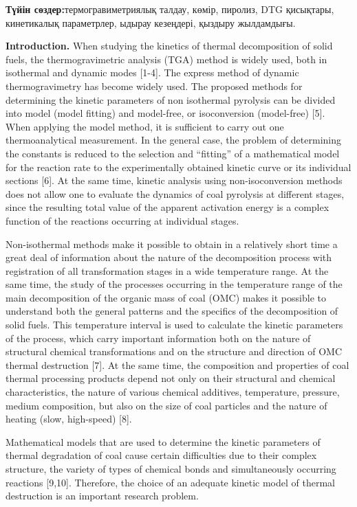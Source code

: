 {\bfseries Түйін сөздер:}термогравиметриялық талдау, көмір, пиролиз, DTG
қисықтары, кинетикалық параметрлер, ыдырау кезеңдері, қыздыру
жылдамдығы.

\begin{multicols}{2}
{\bfseries Introduction.} When studying the kinetics of thermal
decomposition of solid fuels, the thermogravimetric analysis (TGA)
method is widely used, both in isothermal and dynamic modes {[}1-4{]}.
The express method of dynamic thermogravimetry has become widely used.
The proposed methods for determining the kinetic parameters of non
isothermal pyrolysis can be divided into model (model fitting) and
model-free, or isoconversion (model-free) {[}5{]}. When applying the
model method, it is sufficient to carry out one thermoanalytical
measurement. In the general case, the problem of determining the
constants is reduced to the selection and ``fitting'' of a mathematical
model for the reaction rate to the experimentally obtained kinetic curve
or its individual sections {[}6{]}. At the same time, kinetic analysis
using non-isoconversion methods does not allow one to evaluate the
dynamics of coal pyrolysis at different stages, since the resulting
total value of the apparent activation energy is a complex function of
the reactions occurring at individual stages.

Non-isothermal methods make it possible to obtain in a relatively short
time a great deal of information about the nature of the decomposition
process with registration of all transformation stages in a wide
temperature range. At the same time, the study of the processes
occurring in the temperature range of the main decomposition of the
organic mass of coal (OMC) makes it possible to understand both the
general patterns and the specifics of the decomposition of solid fuels.
This temperature interval is used to calculate the kinetic parameters of
the process, which carry important information both on the nature of
structural chemical transformations and on the structure and direction
of OMC thermal destruction {[}7{]}. At the same time, the composition
and properties of coal thermal processing products depend not only on
their structural and chemical characteristics, the nature of various
chemical additives, temperature, pressure, medium composition, but also
on the size of coal particles and the nature of heating (slow,
high-speed) {[}8{]}.

Mathematical models that are used to determine the kinetic parameters of
thermal degradation of coal cause certain difficulties due to their
complex structure, the variety of types of chemical bonds and
simultaneously occurring reactions {[}9,10{]}. Therefore, the choice of
an adequate kinetic model of thermal destruction is an important
research problem.


\end{multicols}
